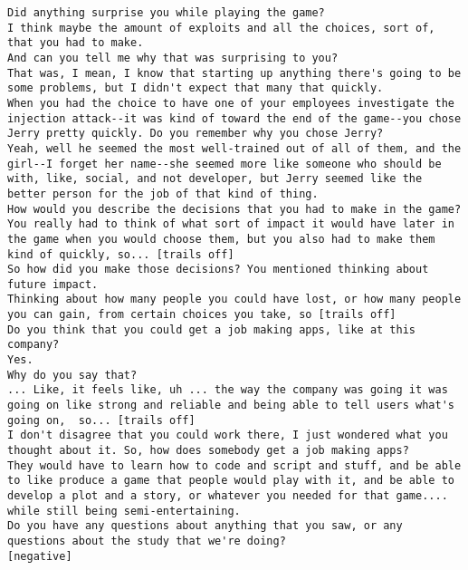 \begin{lstlisting}
Did anything surprise you while playing the game?
I think maybe the amount of exploits and all the choices, sort of, that you had to make.
And can you tell me why that was surprising to you?
That was, I mean, I know that starting up anything there's going to be some problems, but I didn't expect that many that quickly.
When you had the choice to have one of your employees investigate the injection attack--it was kind of toward the end of the game--you chose Jerry pretty quickly. Do you remember why you chose Jerry?
Yeah, well he seemed the most well-trained out of all of them, and the girl--I forget her name--she seemed more like someone who should be with, like, social, and not developer, but Jerry seemed like the better person for the job of that kind of thing.
How would you describe the decisions that you had to make in the game?
You really had to think of what sort of impact it would have later in the game when you would choose them, but you also had to make them kind of quickly, so... [trails off]
So how did you make those decisions? You mentioned thinking about future impact.
Thinking about how many people you could have lost, or how many people you can gain, from certain choices you take, so [trails off]
Do you think that you could get a job making apps, like at this company?
Yes.
Why do you say that?
... Like, it feels like, uh ... the way the company was going it was going on like strong and reliable and being able to tell users what's going on,  so... [trails off]
I don't disagree that you could work there, I just wondered what you thought about it. So, how does somebody get a job making apps?
They would have to learn how to code and script and stuff, and be able to like produce a game that people would play with it, and be able to develop a plot and a story, or whatever you needed for that game.... while still being semi-entertaining. 
Do you have any questions about anything that you saw, or any questions about the study that we're doing?
[negative]
\end{lstlisting}


